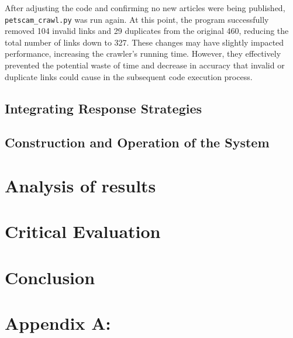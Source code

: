 \documentclass[ oneside,%
                    author={Cassie Qing Tang},
                    degree={BSc},
                     title={The Report for 3D Modelling of Queens Library \\ },
                    subtitle={ }]{dissertation}
\begin{document}
After adjusting the code and confirming no new articles were being published, \texttt{petscam\_crawl.py} was run again. At this point, the program successfully removed 104 invalid links and 29 duplicates from the original 460, reducing the total number of links down to 327. These changes may have slightly impacted performance, increasing the crawler's running time. However, they effectively prevented the potential waste of time and decrease in accuracy that invalid or duplicate links could cause in the subsequent code execution process.


\section{Integrating Response Strategies}





\section{Construction and Operation of the System}





\chapter{Analysis of results}



\chapter{Critical Evaluation}









\chapter{Conclusion}





% 


\appendix

\chapter{Appendix A: }
\label{}
\end{document}
